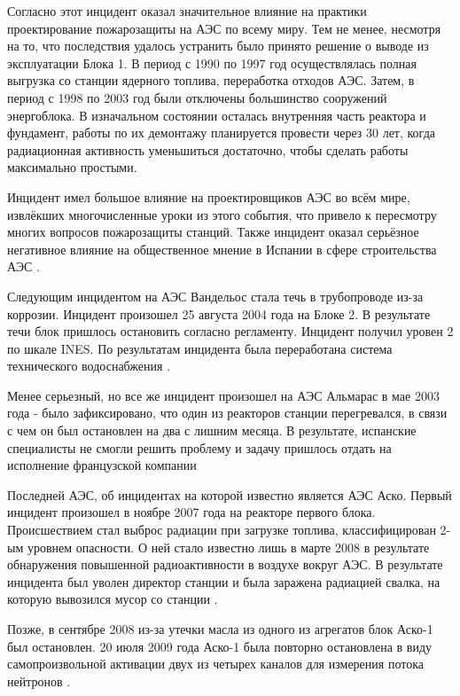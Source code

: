 Согласно \cite{sympaperRodriguez} этот инцидент оказал значительное влияние на практики проектирование пожарозащиты на АЭС по всему миру. Тем не менее, несмотря на то, что последствия удалось устранить было принято решение о выводе из эксплуатации Блока 1. В период с 1990 по 1997 год осуществлялась полная выгрузка со станции ядерного топлива, переработка отходов АЭС. Затем, в период с 1998 по 2003 год были отключены большинство сооружений энергоблока. В изначальном состоянии осталась внутренняя часть реактора и фундамент, работы по их демонтажу планируется провести через 30 лет, когда радиационная активность уменьшиться достаточно, чтобы сделать работы максимально простыми.

Инцидент имел большое влияние на проектировщиков АЭС во всём мире, извлёкших многочисленные уроки из этого события, что привело к пересмотру многих вопросов пожарозащиты станций. Также инцидент оказал серьёзное негативное влияние на общественное мнение в Испании в сфере строительства АЭС \cite{sympaperRodriguez}.

Следующим инцидентом на АЭС Вандельос стала течь в трубопроводе из-за коррозии. Инцидент произошел 25 августа 2004 года на Блоке 2. В результате течи блок пришлось остановить согласно регламенту. Инцидент получил уровен 2 по шкале INES. По результатам инцидента была переработана система технического водоснабжения \cite{nuclearRegulatory}.

Менее серьезный, но все же инцидент произошел на АЭС Альмарас в мае 2003 года - было зафиксировано, что один из реакторов станции перегревался, в связи с чем он был остановлен на два с лишним месяца. В результате, испанские специалисты не смогли решить проблему и задачу пришлось отдать на исполнение французской компании \cite{miraesAlmaras}

Последней АЭС, об инцидентах на которой известно является АЭС Аско. Первый инцидент произошел в ноябре 2007 года на реакторе первого блока. Происшествием стал выброс радиации при загрузке топлива, классифицирован 2-ым уровнем опасности. О ней стало известно лишь в марте 2008 в результате обнаружения повышенной радиоактивности в воздухе вокруг АЭС. В результате инцидента был уволен директор станции и была заражена радиацией свалка, на которую вывозился мусор со станции \cite{miraesAsko}.

Позже, в сентябре 2008 из-за утечки масла из одного из агрегатов блок Аско-1 был остановлен. 20 июля 2009 года Аско-1 была повторно остановлена в виду самопроизвольной активации двух из четырех каналов для измерения потока нейтронов \cite{aesAsko}.